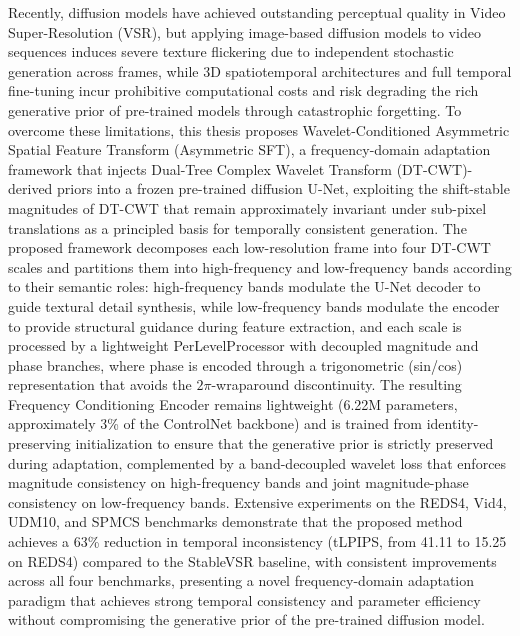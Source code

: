 Recently, diffusion models have achieved outstanding perceptual quality in Video Super-Resolution (VSR), but applying image-based diffusion models to video sequences induces severe texture flickering due to independent stochastic generation across frames, while 3D spatiotemporal architectures and full temporal fine-tuning incur prohibitive computational costs and risk degrading the rich generative prior of pre-trained models through catastrophic forgetting. To overcome these limitations, this thesis proposes Wavelet-Conditioned Asymmetric Spatial Feature Transform (Asymmetric SFT), a frequency-domain adaptation framework that injects Dual-Tree Complex Wavelet Transform (DT-CWT)-derived priors into a frozen pre-trained diffusion U-Net, exploiting the shift-stable magnitudes of DT-CWT that remain approximately invariant under sub-pixel translations as a principled basis for temporally consistent generation. The proposed framework decomposes each low-resolution frame into four DT-CWT scales and partitions them into high-frequency and low-frequency bands according to their semantic roles: high-frequency bands modulate the U-Net decoder to guide textural detail synthesis, while low-frequency bands modulate the encoder to provide structural guidance during feature extraction, and each scale is processed by a lightweight PerLevelProcessor with decoupled magnitude and phase branches, where phase is encoded through a trigonometric (sin/cos) representation that avoids the $2\pi$-wraparound discontinuity. The resulting Frequency Conditioning Encoder remains lightweight (6.22M parameters, approximately 3\% of the ControlNet backbone) and is trained from identity-preserving initialization to ensure that the generative prior is strictly preserved during adaptation, complemented by a band-decoupled wavelet loss that enforces magnitude consistency on high-frequency bands and joint magnitude-phase consistency on low-frequency bands. Extensive experiments on the REDS4, Vid4, UDM10, and SPMCS benchmarks demonstrate that the proposed method achieves a 63\% reduction in temporal inconsistency (tLPIPS, from 41.11 to 15.25 on REDS4) compared to the StableVSR baseline, with consistent improvements across all four benchmarks, presenting a novel frequency-domain adaptation paradigm that achieves strong temporal consistency and parameter efficiency without compromising the generative prior of the pre-trained diffusion model.




